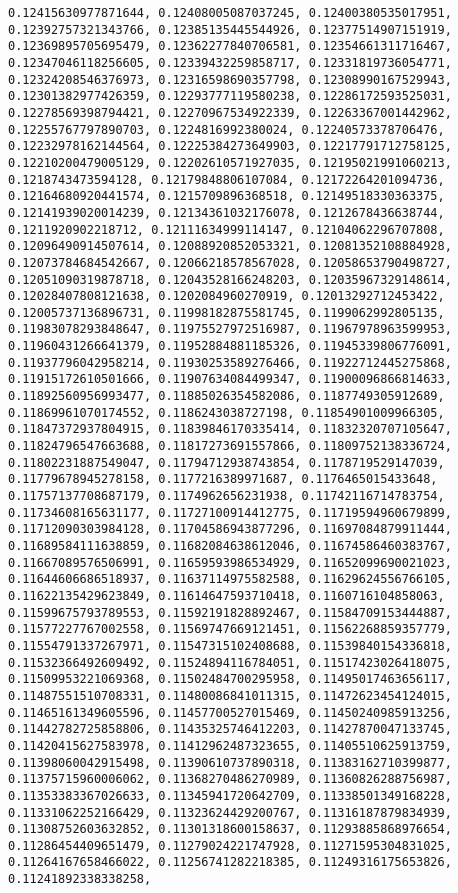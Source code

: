\documentclass[11pt]{article}
\begin{document}
\begin{Verbatim}[commandchars=\\\{\}]
0.12415630977871644, 0.12408005087037245, 0.12400380535017951, 0.12392757321343766, 0.12385135445544926, 0.12377514907151919, 0.12369895705695479, 0.12362277840706581, 0.12354661311716467, 0.12347046118256605, 0.12339432259858717, 0.12331819736054771, 0.12324208546376973, 0.12316598690357798, 0.12308990167529943, 0.12301382977426359, 0.12293777119580238, 0.12286172593525031, 0.12278569398794421, 0.12270967534922339, 0.12263367001442962, 0.12255767797890703, 0.1224816992380024, 0.12240573378706476, 0.12232978162144564, 0.12225384273649903, 0.12217791712758125, 0.12210200479005129, 0.12202610571927035, 0.12195021991060213, 0.1218743473594128, 0.12179848806107084, 0.12172264201094736, 0.12164680920441574, 0.1215709896368518, 0.12149518330363375, 0.12141939020014239, 0.12134361032176078, 0.1212678436638744, 0.1211920902218712, 0.12111634999114147, 0.12104062296707808, 0.12096490914507614, 0.12088920852053321, 0.12081352108884928, 0.12073784684542667, 0.12066218578567028, 0.12058653790498727, 0.12051090319878718, 0.12043528166248203, 0.12035967329148614, 0.12028407808121638, 0.1202084960270919, 0.12013292712453422, 0.12005737136896731, 0.11998182875581745, 0.1199062992805135, 0.11983078293848647, 0.11975527972516987, 0.11967978963599953, 0.11960431266641379, 0.11952884881185326, 0.11945339806776091, 0.11937796042958214, 0.11930253589276466, 0.11922712445275868, 0.11915172610501666, 0.11907634084499347, 0.11900096866814633, 0.11892560956993477, 0.11885026354582086, 0.1187749305912689, 0.11869961070174552, 0.1186243038727198, 0.11854901009966305, 0.11847372937804915, 0.11839846170335414, 0.11832320707105647, 0.11824796547663688, 0.11817273691557866, 0.11809752138336724, 0.11802231887549047, 0.11794712938743854, 0.1178719529147039, 0.11779678945278158, 0.1177216389971687, 0.1176465015433648, 0.11757137708687179, 0.1174962656231938, 0.11742116714783754, 0.11734608165631177, 0.11727100914412775, 0.11719594960679899, 0.11712090303984128, 0.11704586943877296, 0.11697084879911444, 0.11689584111638859, 0.11682084638612046, 0.11674586460383767, 0.11667089576506991, 0.11659593986534929, 0.11652099690021023, 0.11644606686518937, 0.11637114975582588, 0.11629624556766105, 0.11622135429623849, 0.11614647593710418, 0.1160716104858063, 0.11599675793789553, 0.11592191828892467, 0.11584709153444887, 0.11577227767002558, 0.11569747669121451, 0.11562268859357779, 0.11554791337267971, 0.11547315102408688, 0.11539840154336818, 0.11532366492609492, 0.11524894116784051, 0.11517423026418075, 0.11509953221069368, 0.11502484700295958, 0.11495017463656117, 0.11487551510708331, 0.11480086841011315, 0.11472623454124015, 0.11465161349605596, 0.11457700527015469, 0.11450240985913256, 0.11442782725858806, 0.11435325746412203, 0.11427870047133745, 0.11420415627583978, 0.11412962487323655, 0.11405510625913759, 0.11398060042915498, 0.11390610737890318, 0.11383162710399877, 0.11375715960006062, 0.11368270486270989, 0.11360826288756987, 0.11353383367026633, 0.11345941720642709, 0.11338501349168228, 0.11331062252166429, 0.11323624429200767, 0.11316187879834939, 0.11308752603632852, 0.11301318600158637, 0.11293885868976654, 0.11286454409651479, 0.11279024221747928, 0.11271595304831025, 0.11264167658466022, 0.11256741282218385, 0.11249316175653826, 0.11241892338338258, 
\end{Verbatim}
\end{document}
